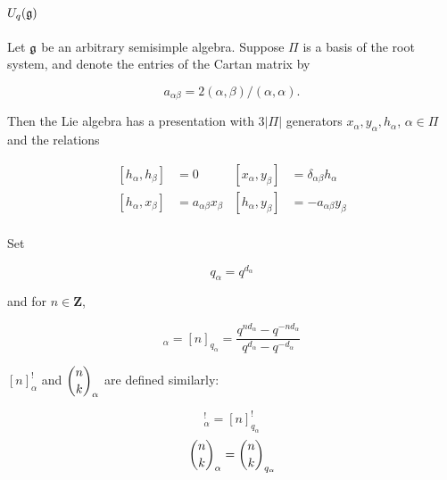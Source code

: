 \section{$U_q(\mathfrak{g})$}
\label{U_q(g)}


    Let $\mathfrak{g}$ be an arbitrary semisimple algebra. Suppose $\Pi$ is
    a basis of the root system, and denote the entries of the Cartan matrix
    by 

    \begin{equation}
        a_{\alpha\beta} = 2(\alpha, \beta) / (\alpha, \alpha).
    \end{equation}

    Then the Lie algebra has a presentation with $3|\Pi|$ generators
    $x_\alpha, y_\alpha, h_\alpha$, $\alpha \in \Pi$ and the relations 

    \begin{align}
        \left[ h_\alpha, h_\beta \right] &= 0       &   \left[ x_\alpha, y_\beta \right] &= \delta_{\alpha\beta} h_\alpha \\
        \left[ h_\alpha, x_\beta \right] &= a_{\alpha\beta} x_\beta  &   \left[ h_\alpha, y_\beta \right] &= -a_{\alpha\beta} y_\beta \\
    \end{align}

    Set

    \begin{equation}
        q_\alpha = q^{d_\alpha}
    \end{equation}

    and for $n \in \mathbf{Z}$,

    \begin{equation}
        [n]_\alpha = [n]_{q_\alpha} = \frac{q^{nd_\alpha} - q^{-nd_\alpha}}{q^{d_\alpha} - q^{-d_\alpha}}
    \end{equation}

    $[n]_\alpha^!$ and $\dbinom{n}{k}_\alpha$ are defined similarly: 
    
    \begin{equation}
        [n]_\alpha^! = [n]_{q_{\alpha}}^!
    \end{equation}
    \begin{equation}
        \dbinom{n}{k}_\alpha = \dbinom{n}{k}_{q_\alpha}
    \end{equation}

